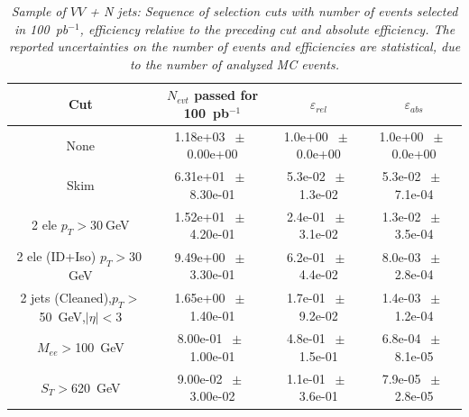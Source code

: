 \begin{table}[htbp] 
\begin{center} 
\begin{tabular}{|c|c|c|c|} 
\hline\hline 
 Cut & $N_{evt}$ passed for 100~pb$^{-1}$ & $\varepsilon_{rel}$ & $\varepsilon_{abs}$ \\ 
\hline\hline 
None       &        1.18e+03       $~\pm~$       0.00e+00        &        1.0e+00       $~\pm~$       0.0e+00        &        1.0e+00       $~\pm~$       0.0e+00       \\       
       Skim       &        6.31e+01       $~\pm~$       8.30e-01        &        5.3e-02       $~\pm~$       1.3e-02        &        5.3e-02       $~\pm~$       7.1e-04       \\       
       2 ele $p_T>30~$GeV       &        1.52e+01       $~\pm~$       4.20e-01        &        2.4e-01       $~\pm~$       3.1e-02        &        1.3e-02       $~\pm~$       3.5e-04       \\       
       2 ele (ID+Iso) $p_T>30~$GeV       &        9.49e+00       $~\pm~$       3.30e-01        &        6.2e-01       $~\pm~$       4.4e-02        &        8.0e-03       $~\pm~$       2.8e-04       \\       
       2 jets (Cleaned),$p_T>$50~GeV,$|\eta|<$3       &        1.65e+00       $~\pm~$       1.40e-01        &        1.7e-01       $~\pm~$       9.2e-02        &        1.4e-03       $~\pm~$       1.2e-04       \\       
       $M_{ee}>$100~GeV       &        8.00e-01       $~\pm~$       1.00e-01        &        4.8e-01       $~\pm~$       1.5e-01        &        6.8e-04       $~\pm~$       8.1e-05       \\       
       $S_T>$620~GeV       &        9.00e-02       $~\pm~$       3.00e-02        &        1.1e-01       $~\pm~$       3.6e-01        &        7.9e-05       $~\pm~$       2.8e-05       \\       
          \hline\hline 
\end{tabular} 
\end{center} 
\caption{\small \sl Sample of $VV$ + N jets: Sequence of selection cuts with number of events selected in 100~pb$^{-1}$, efficiency relative to the preceding cut and absolute efficiency.  The reported uncertainties on the number of events and efficiencies are statistical, due to the number of analyzed MC events.} 
\label{tab:effic-VV} 
\end{table} 

